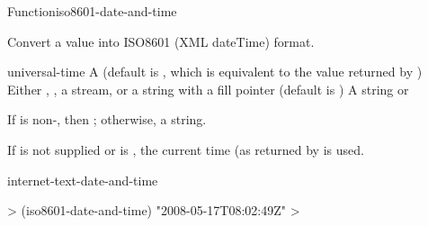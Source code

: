 \documentclass[10pt,twoside,english,pdftex]{article}
\begin{document}

\begin{functiondoc}{Function}{iso8601-date-and-time}{%
    }
% 

\fnsyntax

\fnpurpose Convert a  value into ISO8601 (XML dateTime) format.

\fnpackage {}

\fnmodule {}

\fnargs
\begin{args}{universal-time}
 A  (default is \nil,
  which is equivalent to the value returned by
  )
\arg[destination] Either \nil, , a stream, or a string with a fill 
pointer (default is \nil)
\arg[result] A string or \nil{}
\end{args}

\fnreturns If  is non-\nil, then \nil; otherwise, a string.

\fndescription
{}%
%
If  is not supplied or is \nil, the current time
(as returned by  is used.

\begin{alsos}{internet-text-date-and-time}
\end{alsos}

\fnexample
%
\W\supp
\begin{example}
  > (iso8601-date-and-time)
  "2008-05-17T08:02:49Z"
  >
\end{example}

\end{functiondoc}

\end{document}
